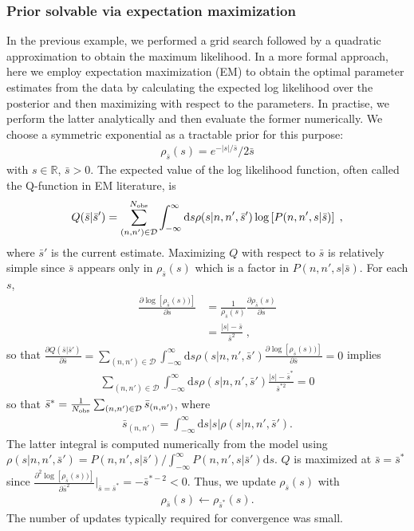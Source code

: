 \documentclass[letterpaper,english,prl,reprint,longbibliography]{revtex4-1} %
\begin{document}
\subsubsection*{Prior solvable via expectation maximization}
In the previous example, we performed a grid search followed by a quadratic approximation to obtain the maximum likelihood. In a more formal approach, here we employ expectation maximization (EM) to obtain the optimal parameter estimates from the data by calculating the expected log likelihood over the posterior and then maximizing with respect to the parameters. In practise, we perform the latter analytically and then evaluate the former numerically. We choose a symmetric exponential as a tractable prior for this purpose:
\begin{align}
	\rho_{\bar{s}}(s)=e^{-|s|/\bar{s}}/2\bar{s}
\end{align}
with $s\in\mathbb{R}$, $\bar{s}>0$. The expected value of the log likelihood function, often called the Q-function in EM literature, is 
 \begin{align}
 Q(\bar{s}|\bar{s}')=\sum_{(n,n')\in\mathcal{D}}^{N_\textrm{\textrm{obs}}}\int_{-\infty}^{\infty}\mathrm{d}s\rho(s|n,n',\bar{s}')\log \left[P(n,n',s|\bar{s})\right]\;,
 \end{align}
 where $\bar{s}'$ is the current estimate.
 Maximizing $Q$  with respect to $\bar{s}$ is relatively simple since $\bar{s}$ appears only in $\rho_{\bar{s}}(s)$  which is a factor in $P(n,n',s|\bar{s})$. For each $s$,
 \begin{align}
 \frac{\partial \log \left[\rho_{\bar{s}}(s))\right] }{\partial\bar{s}} &=\frac{1}{\rho_{\bar{s}}(s)} \frac{\partial\rho_{\bar{s}}(s)}{\partial\bar{s}}\\&=\frac{|s|-\bar{s}}{\bar{s}^2}\;,
 \end{align}
so that $  \frac{\partial Q(\bar{s}|\bar{s}')}{\partial\bar{s}}=\sum_{(n,n')\in\mathcal{D}}\int_{-\infty}^{\infty}\mathrm{d}s\rho(s|n,n',\bar{s}')\frac{\partial \log \left[\rho_{\bar{s}}(s))\right] }{\partial\bar{s}} =0$ implies
\begin{align}
  \sum_{(n,n')\in\mathcal{D}}\int_{-\infty}^{\infty}\mathrm{d}s\rho(s|n,n',\bar{s}')\frac{|s|-\bar{s}^*}{\bar{s}^{*2}} =0
\end{align}
so that $\bar{s}^*=\frac{1}{N_\textrm{\textrm{obs}}}\sum_{(n,n')\in\mathcal{D}}\bar{s}_{(n,n')}$, where 
\begin{align}
\bar{s}_{(n,n')}=\int_{-\infty}^{\infty}\mathrm{d}s|s|\rho(s|n,n',\bar{s}').
\end{align}
The latter integral is computed numerically from the model using $\rho(s|n,n',\bar{s}')=P(n,n',s|\bar{s}')/\int_{-\infty}^{\infty}P(n,n',s|\bar{s}')\mathrm{d}s	$. $Q$ is maximized at $\bar{s}=\bar{s}^*$ since  $ \frac{\partial^2 \log \left[\rho_{\bar{s}}(s))\right] }{\partial\bar{s}^2}\bigg|_{\bar{s}=\bar{s}^*}=-\bar{s}^{*-2} <0$. Thus, we update $\rho_{\bar{s}}(s)$ with 
\begin{align}
\rho_{\bar{s}}(s)\leftarrow\rho_{\bar{s}^*}(s).
\end{align}
The number of updates typically required for convergence was small.
\end{document}

